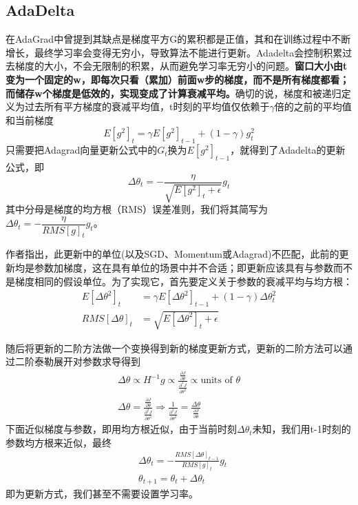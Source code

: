 \documentclass[10.5pt,a4paper]{article}%
\begin{document}
        \subsection{AdaDelta}
            在AdaGrad中曾提到其缺点是梯度平方G的累积都是正值，其和在训练过程中不断增长，最终学习率会变得无穷小，导致算法不能进行更新。Adadelta\cite{adadelta}会控制积累过去梯度的大小，不会无限制的积累，从而避免学习率无穷小的问题。\textbf{窗口大小由t变为一个固定的w，即每次只看（累加）前面w步的梯度，而不是所有梯度都看；而储存w个梯度是低效的，实现变成了计算衰减平均。}确切的说，梯度和被递归定义为过去所有平方梯度的衰减平均值，t时刻的平均值仅依赖于$\gamma$倍的之前的平均值和当前梯度
            $$E[g^2]_t=\gamma E[g^2]_{t-1}+(1-\gamma)g_t^2$$
            只需要把Adagrad向量更新公式中的$G_t$换为$E[g^2]_{t-1}$，就得到了Adadelta的更新公式，即
            $$ \Delta\theta_t=-\dfrac{\eta}{\sqrt{E[g^2]_t+\epsilon}}g_t$$
            其中分母是梯度的均方根（RMS）误差准则，我们将其简写为$\Delta\theta_t=-\dfrac{\eta}{RMS[g]_t}g_t$。\par
            作者指出，此更新中的单位(以及SGD、Momentum或Adagrad)不匹配，此前的更新均是参数加梯度，这在具有单位的场景中并不合适；即更新应该具有与参数而不是梯度相同的假设单位。为了实现它，首先要定义关于参数的衰减平均与均方根：
            \begin{align*}
            E[\Delta\theta^2]_t&=\gamma E[\Delta\theta^2]_{t-1}+(1-\gamma)\Delta\theta^2_t\\
            RMS[\Delta\theta]_t&=\sqrt{E[\Delta\theta^2]_t+\epsilon}
            \end{align*}\par
            随后将更新的二阶方法做一个变换得到新的梯度更新方式，更新的二阶方法可以通过二阶泰勒展开对参数求导得到
            \begin{align*}
            \Delta \theta\propto H^{-1}g\propto\frac{\frac{\partial J}{\partial \theta}}{\frac{\partial^2J}{\partial \theta^2}}\propto\text{units of }\theta\\
            \Delta \theta=\frac{\frac{\partial J}{\partial \theta}}{\frac{\partial^2J}{\partial \theta^2}}\Rightarrow\frac{1}{\frac{\partial^2J}{\partial \theta^2}}=\frac{\Delta \theta}{\frac{\partial J}{\partial \theta}}
            \end{align*}
            下面近似梯度与参数，即用均方根近似，由于当前时刻$\Delta\theta_t$未知，我们用t-1时刻的参数均方根来近似，最终
            \begin{align*}&\Delta\theta_t=-\frac{RMS[\Delta\theta]_{t-1}}{RMS[g]_t}g_t\\ &\theta_{t+1}=\theta_t+\Delta\theta_t\end{align*}
            即为更新方式，我们甚至不需要设置学习率。
\end{document}
